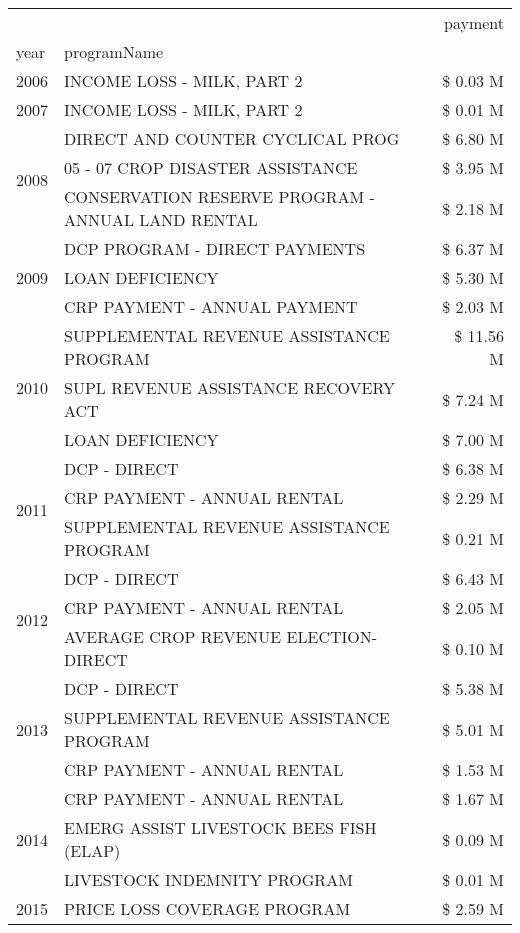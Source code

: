 \begin{tabular}{llr}
\toprule
 &  & payment \\
year & programName &  \\
\midrule
2006 & INCOME LOSS - MILK, PART 2 & \$ 0.03 M \\
\cline{1-3}
2007 & INCOME LOSS - MILK, PART 2 & \$ 0.01 M \\
\cline{1-3}
\multirow[t]{3}{*}{2008} & DIRECT AND COUNTER CYCLICAL PROG & \$ 6.80 M \\
 & 05 - 07 CROP DISASTER ASSISTANCE & \$ 3.95 M \\
 & CONSERVATION RESERVE PROGRAM - ANNUAL LAND RENTAL & \$ 2.18 M \\
\cline{1-3}
\multirow[t]{3}{*}{2009} & DCP PROGRAM - DIRECT PAYMENTS & \$ 6.37 M \\
 & LOAN DEFICIENCY & \$ 5.30 M \\
 & CRP PAYMENT - ANNUAL PAYMENT & \$ 2.03 M \\
\cline{1-3}
\multirow[t]{3}{*}{2010} & SUPPLEMENTAL REVENUE ASSISTANCE PROGRAM & \$ 11.56 M \\
 & SUPL REVENUE ASSISTANCE RECOVERY ACT & \$ 7.24 M \\
 & LOAN DEFICIENCY & \$ 7.00 M \\
\cline{1-3}
\multirow[t]{3}{*}{2011} & DCP - DIRECT & \$ 6.38 M \\
 & CRP PAYMENT - ANNUAL RENTAL & \$ 2.29 M \\
 & SUPPLEMENTAL REVENUE ASSISTANCE PROGRAM & \$ 0.21 M \\
\cline{1-3}
\multirow[t]{3}{*}{2012} & DCP - DIRECT & \$ 6.43 M \\
 & CRP PAYMENT - ANNUAL RENTAL & \$ 2.05 M \\
 & AVERAGE CROP REVENUE ELECTION-DIRECT & \$ 0.10 M \\
\cline{1-3}
\multirow[t]{3}{*}{2013} & DCP - DIRECT & \$ 5.38 M \\
 & SUPPLEMENTAL REVENUE ASSISTANCE PROGRAM & \$ 5.01 M \\
 & CRP PAYMENT - ANNUAL RENTAL & \$ 1.53 M \\
\cline{1-3}
\multirow[t]{3}{*}{2014} & CRP PAYMENT - ANNUAL RENTAL & \$ 1.67 M \\
 & EMERG ASSIST LIVESTOCK BEES FISH (ELAP) & \$ 0.09 M \\
 & LIVESTOCK INDEMNITY PROGRAM & \$ 0.01 M \\
\cline{1-3}
\multirow[t]{3}{*}{2015} & PRICE LOSS COVERAGE PROGRAM & \$ 2.59 M \\

\end{tabular}
